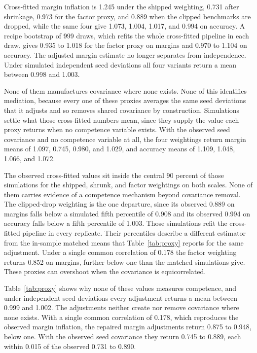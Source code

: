 Cross-fitted margin inflation is 1.245 under the shipped weighting, 0.731 after shrinkage, 0.973 for the factor proxy, and 0.889 when the clipped benchmarks are dropped, while the same four give 1.073, 1.004, 1.017, and 0.994 on accuracy. A recipe bootstrap of 999 draws, which refits the whole cross-fitted pipeline in each draw, gives 0.935 to 1.018 for the factor proxy on margins and 0.970 to 1.104 on accuracy. The adjusted margin estimate no longer separates from independence. Under simulated independent seed deviations all four variants return a mean between 0.998 and 1.003.

None of them manufactures covariance where none exists. None of this identifies mediation, because every one of these proxies averages the same seed deviations that it adjusts and so removes shared covariance by construction. Simulations settle what those cross-fitted numbers mean, since they supply the value each proxy returns when no competence variable exists. With the observed seed covariance and no competence variable at all, the four weightings return margin means of 1.097, 0.745, 0.980, and 1.029, and accuracy means of 1.109, 1.048, 1.066, and 1.072.

The observed cross-fitted values sit inside the central 90 percent of those simulations for the shipped, shrunk, and factor weightings on both scales. None of them carries evidence of a competence mechanism beyond covariance removal. The clipped-drop weighting is the one departure, since its observed 0.889 on margins falls below a simulated fifth percentile of 0.908 and its observed 0.994 on accuracy falls below a fifth percentile of 1.003. Those simulations refit the cross-fitted pipeline in every replicate. Their percentiles describe a different estimator from the in-sample matched means that Table~\ref{tab:proxy} reports for the same adjustment. Under a single common correlation of 0.178 the factor weighting returns 0.852 on margins, further below one than the matched simulations give. These proxies can overshoot when the covariance is equicorrelated.

Table~\ref{tab:proxy} shows why none of these values measures competence, and under independent seed deviations every adjustment returns a mean between 0.999 and 1.002. The adjustments neither create nor remove covariance where none exists. With a single common correlation of 0.178, which reproduces the observed margin inflation, the repaired margin adjustments return 0.875 to 0.948, below one. With the observed seed covariance they return 0.745 to 0.889, each within 0.015 of the observed 0.731 to 0.890.

